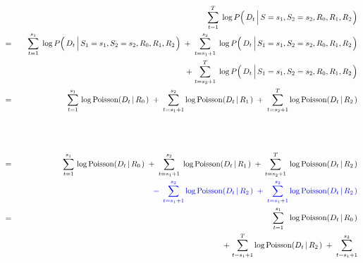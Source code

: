 \begin{eqnarray*}
&&
	\overset{T}{\underset{t=1}{\sum}}\;
	\log P\!\left(\,D_{t} \left\vert\,S\overset{{\color{white}1}}{=}s_{1},S_{2}=s_{2},R_{0},R_{1},R_{2}\right.\right)
\\
&=&
	{\color{white}+} \;
	\overset{s_{1}}{\underset{t=1}{\sum}}\;
	\log P\!\left(\,D_{t} \left\vert\,S_{1}\overset{{\color{white}1}}{=}s_{1},S_{2}=s_{2},R_{0},R_{1},R_{2}\right.\right)
	\; + \;
	\overset{s_{2}}{\underset{t=s_{1}+1}{\sum}}\;
	\log P\!\left(\,D_{t} \left\vert\,S_{1}\overset{{\color{white}1}}{=}s_{1},S_{2}=s_{2},R_{0},R_{1},R_{2}\right.\right)
\\
&&
	+ \;
	\overset{T}{\underset{t=s_{2}+1}{\sum}}\;
	\log P\!\left(\,D_{t} \left\vert\,S_{1}\overset{{\color{white}1}}{=}s_{1},S_{2}=s_{2},R_{0},R_{1},R_{2}\right.\right)
\\
&=&
	\overset{s_{1}}{\underset{t=1}{\sum}}\,
	\log \textnormal{Poisson}\!\left(D_{t} \left\vert\,R_{0}\right.\right)
	\; + \;
	\overset{s_{2}}{\underset{t=s_{1}+1}{\sum}}
	\log \textnormal{Poisson}\!\left(D_{t} \left\vert\,R_{1}\right.\right)
	\; + \;
	\overset{T}{\underset{t=s_{2}+1}{\sum}}
	\log \textnormal{Poisson}\!\left(D_{t} \left\vert\,R_{2}\right.\right)
\\
\\
\\
\\
&=&
	\overset{s_{1}}{\underset{t=1}{\sum}}\,
	\log \textnormal{Poisson}\!\left(D_{t} \left\vert\,R_{0}\right.\right)
	\; + \;
	\overset{s_{2}}{\underset{t=s_{1}+1}{\sum}}\;
	\log \textnormal{Poisson}\!\left(D_{t} \left\vert\,R_{1}\right.\right)
	\; + \;
	\overset{T}{\underset{t=s_{2}+1}{\sum}}\;
	\log \textnormal{Poisson}\!\left(D_{t} \left\vert\,R_{2}\right.\right)
\\
&&
	{\color{white}
		\overset{s_{1}}{\underset{t=1}{\sum}}\,
		\log \textnormal{Poisson}\!\left(D_{t} \left\vert\,R_{0}\right.\right)
		}
	{\color{blue}
		\;\; - \;\,
		\overset{s_{2}}{\underset{t=s_{1}+1}{\sum}}
		\log \textnormal{Poisson}\!\left(D_{t} \left\vert\,R_{2}\right.\right)
		\; + \;
		\overset{s_{2}}{\underset{t=s_{1}+1}{\sum}}
		\log \textnormal{Poisson}\!\left(D_{t} \left\vert\,R_{2}\right.\right)
		}
\\
&=&
	{\color{white}++} \,
	\overset{s_{1}}{\underset{t=1}{\sum}}\;\;
	\log \textnormal{Poisson}\!\left(D_{t} \left\vert\,R_{0}\right.\right)
\\
&&
	+ \;
	\overset{T}{\underset{t=s_{1}+1}{\sum}}
	\log \textnormal{Poisson}\!\left(D_{t} \left\vert\,R_{2}\right.\right)
	\; + \;
	\overset{s_{2}}{\underset{t=s_{1}+1}{\sum}}

\end{eqnarray*}
